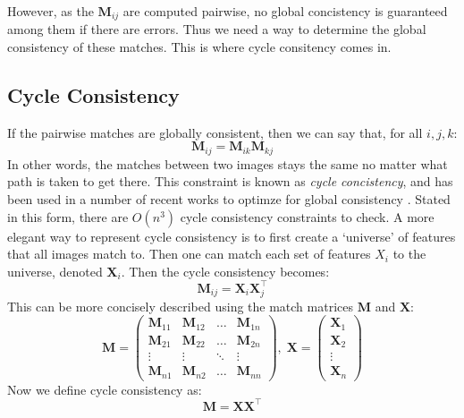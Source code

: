 \documentclass[10pt,twocolumn,letterpaper]{article}
\newcommand{\mat}[1]{\mathbf{#1}}
\begin{document}
However, as the $\mat{M}_{ij}$ are computed pairwise, no global concistency is guaranteed among them if there are errors. 
Thus we need a way to determine the global consistency of these matches.
This is where cycle consitency comes in.

\subsection{Cycle Consistency}
If the pairwise matches are globally consistent, then we can say that, for all $i, j, k$:
\begin{equation}
\mat{M}_{ij} = \mat{M}_{ik} \mat{M}_{kj}
\label{eq:cycconsist1}
\end{equation}
In other words, the matches between two images stays the same no matter what path is taken to get there. 
This constraint is known as \textit{cycle concistency}, and has been used in a number of recent works to optimze for global consistency \cite{zhou2015multi, wang2017multi, leonardos2016distributed}.
Stated in this form, there are $O(n^3)$ cycle consistency constraints to check.
A more elegant way to represent cycle consistency is to first create a `universe' of features that all images match to.
Then one can match each set of features $X_i$ to the universe, denoted $\mat{X}_i$.
Then the cycle consistency becomes:
\begin{equation}
\mat{M}_{ij} = \mat{X}_{i}\mat{X}_{j}^\top
\label{eq:cycconsist2}
\end{equation}
This can be more concisely described using the match matrices $\mat{M}$ and $\mat{X}$:
\begin{equation}
\mat{M} = \begin{pmatrix}
\mat{M}_{11} & \mat{M}_{12} & \hdots & \mat{M}_{1n} \\
\mat{M}_{21} & \mat{M}_{22} & \hdots & \mat{M}_{2n} \\
   \vdots    &     \vdots   & \ddots &    \vdots    \\
\mat{M}_{n1} & \mat{M}_{n2} & \hdots & \mat{M}_{nn}
\end{pmatrix}, \;
\mat{X} = \begin{pmatrix}
\mat{X}_{1}  \\
\mat{X}_{2}  \\
   \vdots     \\
\mat{X}_{n} 
\end{pmatrix}
\label{eq:matchmat}
\end{equation}
Now we define cycle consistency as:
\begin{equation}
\mat{M} = \mat{X} \mat{X}^\top
\label{eq:cycconsist3}
\end{equation}
\end{document}
